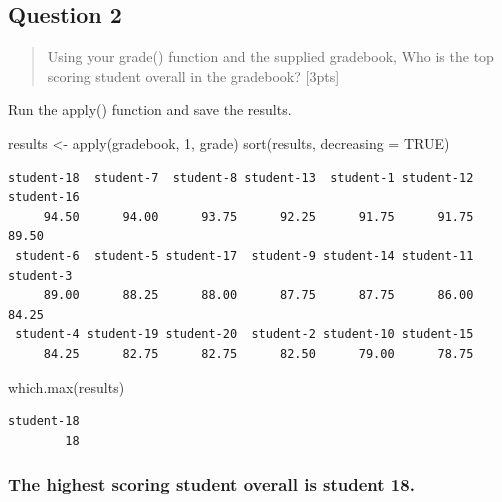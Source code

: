 \documentclass[
  letterpaper,
  DIV=11,
  numbers=noendperiod]{scrartcl}
\newenvironment{Shaded}{\begin{snugshade}}{\end{snugshade}}
\newcommand{\AttributeTok}[1]{\textcolor[rgb]{0.40,0.45,0.13}{#1}}
\newcommand{\ConstantTok}[1]{\textcolor[rgb]{0.56,0.35,0.01}{#1}}
\newcommand{\DecValTok}[1]{\textcolor[rgb]{0.68,0.00,0.00}{#1}}
\newcommand{\FunctionTok}[1]{\textcolor[rgb]{0.28,0.35,0.67}{#1}}
\newcommand{\NormalTok}[1]{\textcolor[rgb]{0.00,0.23,0.31}{#1}}
\newcommand{\OtherTok}[1]{\textcolor[rgb]{0.00,0.23,0.31}{#1}}
\begin{document}
\hypertarget{question-2}{%
\subsection{Question 2}\label{question-2}}

\begin{quote}
Using your grade() function and the supplied gradebook, Who is the top
scoring student overall in the gradebook? {[}3pts{]}
\end{quote}

Run the apply() function and save the results.

\begin{Shaded}
\begin{Highlighting}[]
\NormalTok{results }\OtherTok{\textless{}{-}} \FunctionTok{apply}\NormalTok{(gradebook, }\DecValTok{1}\NormalTok{, grade)}
\FunctionTok{sort}\NormalTok{(results, }\AttributeTok{decreasing =} \ConstantTok{TRUE}\NormalTok{)}
\end{Highlighting}
\end{Shaded}

\begin{verbatim}
student-18  student-7  student-8 student-13  student-1 student-12 student-16 
     94.50      94.00      93.75      92.25      91.75      91.75      89.50 
 student-6  student-5 student-17  student-9 student-14 student-11  student-3 
     89.00      88.25      88.00      87.75      87.75      86.00      84.25 
 student-4 student-19 student-20  student-2 student-10 student-15 
     84.25      82.75      82.75      82.50      79.00      78.75 
\end{verbatim}

\begin{Shaded}
\begin{Highlighting}[]
\FunctionTok{which.max}\NormalTok{(results)}
\end{Highlighting}
\end{Shaded}

\begin{verbatim}
student-18 
        18 
\end{verbatim}

\hypertarget{the-highest-scoring-student-overall-is-student-18.}{%
\subsubsection{\texorpdfstring{The highest scoring student overall is
\textbf{student
18}.}{The highest scoring student overall is student 18.}}\label{the-highest-scoring-student-overall-is-student-18.}}
\end{document}
